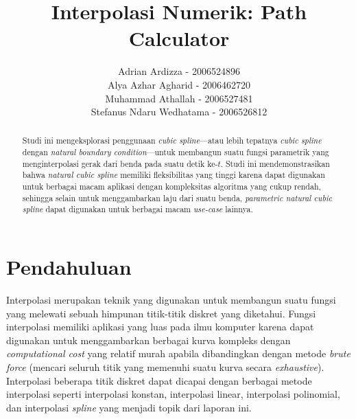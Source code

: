 \documentclass[journal,12pt,onecolumn,a4paper]{IEEEtran}
\begin{document}
\begin{titlepage}
	\title{Interpolasi Numerik: Path Calculator}



	\author{Adrian Ardizza - 2006524896\\
		Alya Azhar Agharid - 2006462720\\
		Muhammad Athallah - 2006527481\\
		Stefanus Ndaru Wedhatama - 2006526812
	}

	\maketitle
	\begin{abstract}
		Studi ini mengeksplorasi penggunaan \emph{cubic spline}---atau lebih tepatnya \emph{cubic spline} dengan \emph{natural boundary condition}---untuk membangun suatu fungsi parametrik yang menginterpolasi gerak dari benda pada suatu detik ke-\(t\). Studi ini mendemonstrasikan bahwa \emph{natural cubic spline} memiliki fleksibilitas yang tinggi karena dapat digunakan untuk berbagai macam aplikasi dengan kompleksitas algoritma yang cukup rendah, sehingga selain untuk menggambarkan laju dari suatu benda, \emph{parametric natural cubic spline} dapat digunakan untuk berbagai macam \emph{use-case} lainnya.
	\end{abstract}
	\tableofcontents
	\listoffigures
\end{titlepage}

\IEEEpeerreviewmaketitle

\section{Pendahuluan}
Interpolasi merupakan teknik yang digunakan untuk membangun suatu fungsi yang melewati sebuah himpunan titik-titik diskret yang diketahui. Fungsi interpolasi memiliki aplikasi yang luas pada ilmu komputer karena dapat digunakan untuk menggambarkan berbagai kurva kompleks dengan \emph{computational cost} yang relatif murah apabila dibandingkan dengan metode \emph{brute force} (mencari seluruh titik yang memenuhi suatu kurva secara \emph{exhaustive}). Interpolasi beberapa titik diskret dapat dicapai dengan berbagai metode interpolasi seperti interpolasi konstan, interpolasi linear, interpolasi polinomial, dan interpolasi \emph{spline} yang menjadi topik dari laporan ini.
\end{document}
